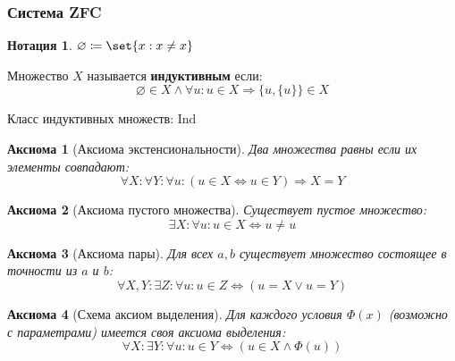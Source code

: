 \documentclass{article}
\newtheorem*{defnotation}{Нотация}
\newtheorem{axiom}{Аксиома}
\newcommand{\InductiveClass}{\mathrm{Ind}}
\begin{document}
\subsubsection{Система ZFC}
    \begin{defnotation}
        \(\varnothing \coloneq \set{x : x \ne x}\)
    \end{defnotation}
    \begin{definition}
        \label{def:inductive-class}
        Множество \(X\) называется \textbf{индуктивным} если:
        \[\varnothing \in X \land \forall u: u \in X \Rightarrow \{u, \{u\}\} \in X\]
        
        Класс индуктивных множеств: \(\InductiveClass\)
    \end{definition}

    \begin{axiom}[Аксиома экстенсиональности]
        Два множества равны если их элементы совпадают:
        \begin{equation}
            \label{ZFC-Ext}
            \forall X: \forall Y: \forall u: \left(u \in X \Leftrightarrow u \in Y \right) \Rightarrow X = Y \tag{Ext}
        \end{equation}
    \end{axiom}
    \begin{axiom}[Аксиома пустого множества]
        Существует пустое множество:
        \begin{equation}
            \label{ZFC-Empty}
            \exists X: \forall u: u \in X \Leftrightarrow u \ne u \tag{Empty}
        \end{equation}
    \end{axiom}
    \begin{axiom}[Аксиома пары]
        Для всех \(a, b\) существует множество состоящее в точности из \(a\) и \(b\):
        \begin{equation}
            \label{ZFC-Pair}
            \forall X,Y: \exists Z: \forall u: u \in Z \Leftrightarrow (u = X \lor  u = Y) \tag{Pair}
        \end{equation}
    \end{axiom}
    \begin{axiom}[Схема аксиом выделения]
        Для каждого условия \(\Phi(x)\) (возможно с параметрами) имеется своя аксиома выделения:
        \begin{equation}
            \label{ZFC-Sep}
            \forall X: \exists Y: \forall u: u \in Y \Leftrightarrow (u \in X \land \Phi(u)) \tag{Sep}
        \end{equation}
    \end{axiom}
\end{document}
